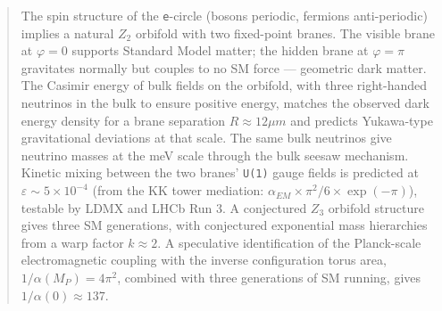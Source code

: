 \documentclass[aps,prd,preprint,superscriptaddress,longbibliography,floatfix]{revtex4-2}
\theoremstyle{remark}
\begin{document}
\begin{abstract}
The spin structure of the \texttt{e}-circle (bosons periodic, fermions anti-periodic) implies a natural $Z_{2}$ orbifold with two fixed-point branes. The visible brane at $\varphi = 0$ supports Standard Model matter; the hidden brane at $\varphi = \pi$ gravitates normally but couples to no SM force --- geometric dark matter. The Casimir energy of bulk fields on the orbifold, with three right-handed neutrinos in the bulk to ensure positive energy, matches the observed dark energy density for a brane separation $R \approx 12 \mu m$ and predicts Yukawa-type gravitational deviations at that scale. The same bulk neutrinos give neutrino masses at the meV scale through the bulk seesaw mechanism. Kinetic mixing between the two branes' \texttt{U(1)} gauge fields is predicted at $\varepsilon \sim  5 \times 10^{-4}$ (from the KK tower mediation: $\alpha_{EM} \times \pi^{2}/6 \times \exp(-\pi)$), testable by LDMX and LHCb Run 3. A conjectured $Z_{3}$ orbifold structure gives three SM generations, with conjectured exponential mass hierarchies from a warp factor $k \approx 2$. A speculative identification of the Planck-scale electromagnetic coupling with the inverse configuration torus area, $1/\alpha(M_P) = 4\pi^{2}$, combined with three generations of SM running, gives $1/\alpha(0) \approx 137$.


\end{abstract}
\end{document}
